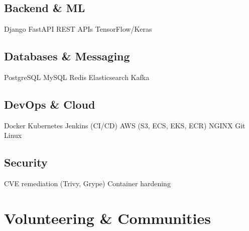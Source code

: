\documentclass[]{openfont}
\begin{document}
\begin{minipage}[t]{0.33\textwidth}
    \subsection{Backend \& ML}
    Django \textbullet{} FastAPI \textbullet{} REST APIs \textbullet{} TensorFlow/Keras
    \sectionsep

    \subsection{Databases \& Messaging}
    PostgreSQL \textbullet{} MySQL \textbullet{} Redis \textbullet{} Elasticsearch \textbullet{} Kafka
    \sectionsep

    \subsection{DevOps \& Cloud}
    Docker \textbullet{} Kubernetes \textbullet{} Jenkins (CI/CD) \textbullet{} AWS (S3, ECS, EKS, ECR) \textbullet{} NGINX \textbullet{} Git \textbullet{} Linux
    \sectionsep

    \subsection{Security}
    CVE remediation (Trivy, Grype) \textbullet{} Container hardening
    \sectionsep

    \section{Volunteering \& Communities}

    \textbullet{} 

    \textbullet{} 

    \textbullet{} 

    \textbullet{} 



\end{minipage}
\end{document}
